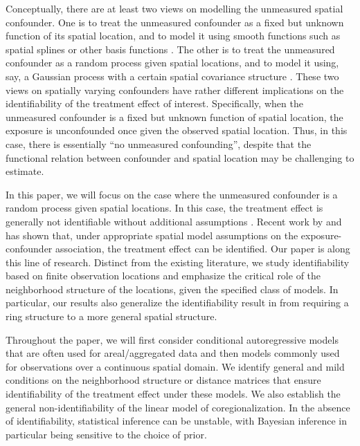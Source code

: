 \documentclass[11pt]{article}
\theoremstyle{definition}
\theoremstyle{remark}
\begin{document}
Conceptually, 
there are at least two views on modelling the unmeasured spatial confounder.
One is to treat the unmeasured confounder as a fixed but unknown function of its spatial location, and to model it using smooth functions such as spatial splines or other basis functions \citep{dupont2022spatial+, gilbert2021approaches}.
The other is to treat the unmeasured confounder as a random process given spatial locations, and to model it using, say, 
a Gaussian process with a certain spatial covariance structure \citep{schnell2020mitigating,guan2023spectral}. 
These two views on spatially varying confounders have rather different implications on the identifiability of the treatment effect of interest. 
Specifically, when the unmeasured confounder is a fixed but unknown function of spatial location, the exposure is unconfounded once given the observed spatial location. Thus, in this case, there is essentially ``no unmeasured confounding'', despite that the functional relation between confounder and spatial location may be challenging to estimate. %

In this paper, we will focus on the case where the unmeasured confounder is a random process given spatial locations. In this case, the treatment effect is generally not identifiable without additional assumptions \citep{schnell2020mitigating}. 
Recent work by \citet{schnell2020mitigating} and \citet{guan2023spectral} has shown that, under appropriate spatial model assumptions on the exposure-confounder association, the treatment effect can be identified. 
Our paper is along this line of research. 
Distinct from the existing literature, we study identifiability based on finite observation locations
and emphasize the critical role of the neighborhood structure of the locations, given the specified class of models.  
In particular, 
our results also 
generalize the identifiability result in \citet{schnell2020mitigating} 
from requiring a ring structure to a more general spatial structure. 



Throughout the paper, we will first consider conditional autoregressive models that are often used for areal/aggregated data %
 and then models commonly used for 
 observations over a continuous spatial domain. 
We identify general and mild conditions on the neighborhood structure or distance matrices that ensure identifiability of the treatment effect under these models. We also establish the general non-identifiability of the linear model of coregionalization. 
In the absence of identifiability, 
statistical inference can be unstable, 
with Bayesian inference in particular being sensitive to the choice of prior.
\end{document}
